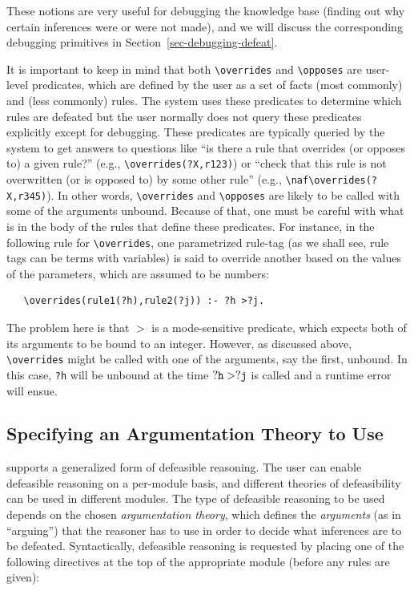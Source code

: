 \documentclass[11pt]{article}
\newcommand{\ERGO}{\mbox{\smaller{\ensuremath{\cal{E}}\smaller{{\sc{RGO}}}}}\xspace}
\newcommand{\FLSYSTEM}{\ERGO}
\newcommand{\bs}{\textbackslash}
\newcommand{\RULELOGNAF}{{\texttt{{\bs}naf}}\xspace}
\begin{document}
These notions are very useful for debugging the knowledge base (finding out why
certain inferences were or were not made), and we will discuss the
corresponding debugging primitives in Section~\ref{sec-debugging-defeat}.

It is important to keep in mind that both \texttt{\bs{}overrides} and
\texttt{\bs{}opposes} are user-level predicates, which are defined by the
user as a set of facts (most commonly) and (less commonly) rules. The
system uses these predicates to determine which rules are defeated but the
user normally does not query these predicates explicitly except for
debugging.  These predicates are typically queried by the system to get
answers to questions like ``is there a rule that overrides (or opposes to)
a given rule?'' (e.g., \texttt{\bs{}overrides(?X,r123)}) or
``check that this rule is not overwritten (or is opposed to) by some other
rule'' (e.g., \texttt{\RULELOGNAF\bs{}overrides(?X,r345)}).
In other words, \texttt{\bs{}overrides} and \texttt{\bs{}opposes} are
likely to be called with some of the arguments unbound.
Because of that, one must be careful with what is in the body of the rules
that define these predicates. For instance, in the following rule for
\texttt{\bs{}overrides}, one parametrized rule-tag (as we shall see, rule
tags can be terms with variables) is said to override
another based on the values of the parameters, which are assumed to be
numbers:
\begin{verbatim}
   \overrides(rule1(?h),rule2(?j)) :- ?h >?j.
\end{verbatim}
The problem here is that $>$ is a mode-sensitive predicate, which expects
both of its arguments to be bound to an integer. However, as discussed above,
\texttt{\bs{}overrides} might be called with one of the arguments, say
the first, unbound. In this case, \texttt{?h} will be unbound at the time
$\tt ?h>?j$ is called and a runtime error will ensue. 


\subsection{Specifying an Argumentation Theory to Use}

\FLSYSTEM supports a generalized form of defeasible reasoning.
The user can enable defeasible reasoning on a per-module basis, and
different theories of defeasibility can be used in different modules.
The type of defeasible reasoning to be used depends on the chosen
\emph{argumentation theory}, which defines the \emph{arguments} (as in
``arguing'') that the reasoner has to use in order to decide what inferences
are to be defeated. Syntactically, defeasible reasoning is requested
by placing one of the following directives at the top of the
appropriate module (before any rules are given):
\end{document}
